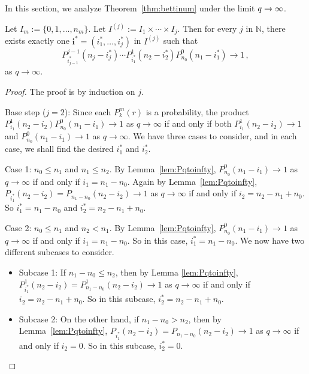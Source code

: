 In this section, we analyze Theorem~\ref{thm:bettinum} under the 
limit $q \rightarrow \infty$.

\begin{proposition}
  \label{prop:oneseq}
Let $I_m:= \{0,1,\ldots, n_m\}$.  Let $I^{(j)}:= I_1\times\cdots \times I_j$.
Then for every $j$ in $\mathbb{N}$, there exists exactly one $\mathbf{i}^\ast =
(i_1^\ast,\ldots, i_j^\ast)$ in $I^{(j)}$ such that 
\[
  P_{i_{j-1}^\ast}^{j-1}(n_j-i_j^\ast)\cdots
  P_{i_1^\ast}^1(n_2-i_2^\ast)P_{n_0}^0(n_1-i_1^\ast) \to 1 \, ,
\]
as $q\to\infty$.
\end{proposition}

\begin{proof}
The proof is by induction on $j$.


Base step ($j=2$): Since each $P^m_k(r)$ is a probability, the product $P_{i_1}^1(n_2 -
i_2)P_{n_0}^0 (n_1 - i_1) \to 1$ as $q\to\infty$ if and only if both
$P_{i_1}^1(n_2 - i_2) \to 1$ and $P_{n_0}^0 (n_1 - i_1) \to 1$ as $q\to
\infty$.  We have three cases to consider, and in each case, we shall find the
desired $i_1^\ast$ and $i_2^\ast$.

Case 1: $n_0\leq n_1$ and $n_1\leq n_2$.  By Lemma~\ref{lem:Pqtoinfty},
$P_{n_0}^0 (n_1 - i_1) \to 1$ as $q\to\infty$ if and only if $i_1 = n_1 - n_0$.
Again by Lemma~\ref{lem:Pqtoinfty}, $P_{i_1^\ast}(n_2 - i_2) = P_{n_1 - n_0}(n_2 - i_2)
\to 1$ as $q\to\infty$ if and only if $i_2 = n_2 - n_1 + n_0$.  So $i_1^\ast = n_1 - n_0$
and $i_2^\ast = n_2 - n_1 + n_0$.

Case 2: $n_0 \leq n_1$ and $n_2 <n_1$. By Lemma~\ref{lem:Pqtoinfty},
$P_{n_0}^0 (n_1 - i_1) \to 1$ as $q\to\infty$ if and only if $i_1 = n_1 - n_0$.
So in this case, $i_1^\ast = n_1 - n_0$. We now have two different subcases to
consider.  
\begin{itemize} 
  \item Subcase 1: If $n_1 - n_0\leq n_2$, then by
    Lemma \ref{lem:Pqtoinfty}, $P_{i_1^\ast}^1(n_2 - i_2) =
    P_{n_1-n_0}^1(n_2-i_2) \to 1$ as $q\to\infty$ if and only if $i_2 = n_2 -
    n_1 + n_0$.  So in this subcase, $i_2^\ast = n_2 - n_1 + n_0$.  
  \item Subcase 2: On the other hand, if $n_1 - n_0 >n_2$, then by 
  Lemma~\ref{lem:Pqtoinfty}, $P_{i_1^\ast}(n_2 - i_2) = P_{n_1-n_0}(n_2-i_2)
    \to 1$ as $q\to\infty$ if and only if $i_2 = 0$.  So in this subcase,
    $i_2^\ast = 0$.  
\end{itemize}


\end{proof}
